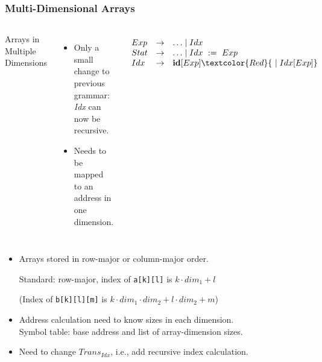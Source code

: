 \documentclass{beamer}
\newcommand{\codesize}{\footnotesize}
\newcommand{\cd}[1]{{{\codesize\tt #1}}}
\newcommand{\red}[1]{\textcolor{Red}{{#1}}}
\renewcommand{\emph}[1]{\textcolor{structure}{#1}}
\newcommand{\emp}[1]{\textcolor{DikuRed}{ #1}}
\begin{document}
\begin{frame}[fragile,t]
	\frametitle{Multi-Dimensional Arrays}

\begin{columns}

\emph{Arrays in Multiple Dimensions}
\medskip

\begin{itemize}
\item Only a small change to previous grammar:
	\textit{Idx} can now be \emp{recursive}.
\item Needs to be mapped to an address in one dimension.
\end{itemize}


{\footnotesize

\renewcommand{\arraystretch}{1.1}
\[\begin{array}{lcl}
Exp & \rightarrow & \ldots \mid Idx\\
Stat & \rightarrow & \ldots \mid Idx ~:=~ Exp \\
Idx & \rightarrow & {\bf id}[Exp] \red{~\mid Idx[Exp]}\\
\end{array}\]

}
\end{columns}

\pause

\bigskip
\bigskip
\begin{itemize}

\item Arrays stored in \emph{row-major} or \emph{column-major} order.
\begin{minipage}{1mm}{\vspace*{-1.5cm}}\end{minipage}

	\emp{Standard: row-major},
	index of \cd{a[k][l]} is $ k\cdot dim_1 + l$

	(Index of \cd{b[k][l][m]} is $ k\cdot dim_1 \cdot dim_2 + l \cdot dim_2 + m $)\smallskip
	
\pause

\item Address calculation \emph{need to know sizes} in each dimension.\\
    \emp{Symbol table: base address and list of array-dimension sizes.}\smallskip

\item Need to change $Trans_{Idx}$, i.e., add recursive index calculation.

\end{itemize}

\end{frame}
\end{document}
